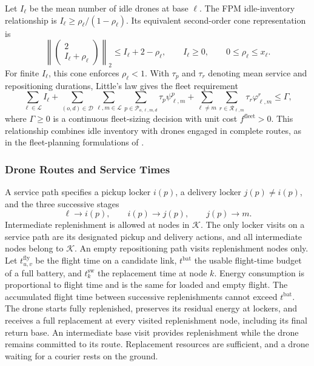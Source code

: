 \documentclass[final,3p,authoryear]{elsarticle}
\begin{document}
Let $I_\ell$ be the mean number of idle drones at base $\ell$.
The FPM idle-inventory relationship is $I_\ell\ge\rho_\ell/(1-\rho_\ell)$.
Its equivalent second-order cone representation is
\begin{equation}
 \left\|\begin{pmatrix}2\\I_\ell+\rho_\ell\end{pmatrix}\right\|_2
 \le I_\ell+2-\rho_\ell,
 \qquad I_\ell\ge0,\qquad 0\le\rho_\ell\le x_\ell.
 \label{eq:path_idle_cone}
\end{equation}
For finite $I_\ell$, this cone enforces $\rho_\ell<1$.
With $\tau_p$ and $\tau_r$ denoting mean service and repositioning durations, Little's law gives the fleet requirement
\begin{equation}
 \sum_{\ell\in\mathcal L}I_\ell
 +\sum_{(o,d)\in\mathcal D}\sum_{\ell,m\in\mathcal L}
   \sum_{p\in\mathcal P_{o,\ell,m,d}}\tau_p\psi_{\ell,m}^{p}
 +\sum_{\ell\ne m}\sum_{r\in\mathcal R_{\ell,m}}\tau_r\varphi_{\ell,m}^{r}
 \le\Gamma,
 \label{eq:path_fleet}
\end{equation}
where $\Gamma\ge0$ is a continuous fleet-sizing decision with unit cost $f^{\mathrm{fleet}}>0$.
This relationship combines idle inventory with drones engaged in complete routes, as in the fleet-planning formulations of \citet{heServiceRegion2017M&SOM,chenCoordinatedDroneCourier2025}.

\subsubsection{Drone Routes and Service Times}
\label{subsubsec:path_times}

A service path specifies a pickup locker $i(p)$, a delivery locker $j(p)\ne i(p)$, and the three successive stages
\begin{equation}
 \ell\longrightarrow i(p),\qquad i(p)\longrightarrow j(p),\qquad j(p)\longrightarrow m.
 \label{eq:path_stages}
\end{equation}
Intermediate replenishment is allowed at nodes in $\mathcal K$.
The only locker visits on a service path are its designated pickup and delivery actions, and all intermediate nodes belong to $\mathcal K$.
An empty repositioning path visits replenishment nodes only.
Let $t_{u,v}^{\mathrm{fly}}$ be the flight time on a candidate link, $t^{\mathrm{bat}}$ the usable flight-time budget of a full battery, and $t_k^{\mathrm{sw}}$ the replacement time at node $k$.
Energy consumption is proportional to flight time and is the same for loaded and empty flight.
The accumulated flight time between successive replenishments cannot exceed $t^{\mathrm{bat}}$.
The drone starts fully replenished, preserves its residual energy at lockers, and receives a full replacement at every visited replenishment node, including its final return base.
An intermediate base visit provides replenishment while the drone remains committed to its route.
Replacement resources are sufficient, and a drone waiting for a courier rests on the ground.
\end{document}
